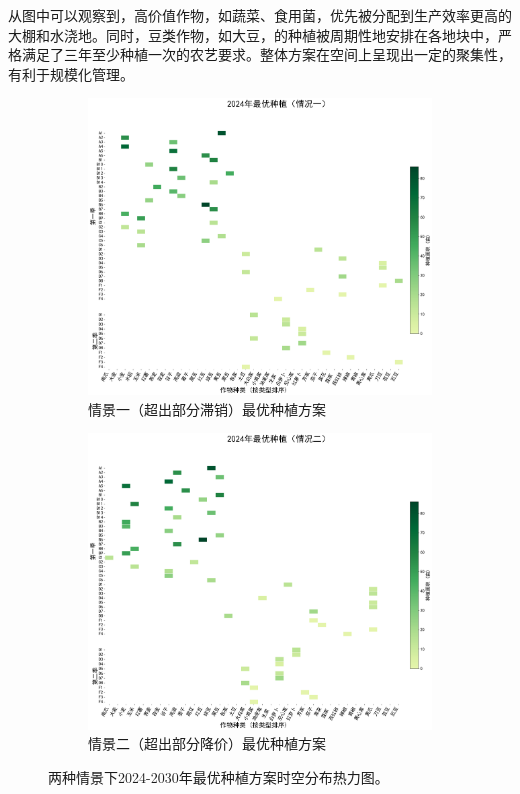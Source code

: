 从图中可以观察到，高价值作物，如蔬菜、食用菌，优先被分配到生产效率更高的大棚和水浇地。同时，豆类作物，如大豆，的种植被周期性地安排在各地块中，严格满足了三年至少种植一次的农艺要求。整体方案在空间上呈现出一定的聚集性，有利于规模化管理。

\begin{figure}[H]
	\centering
	\begin{subfigure}[b]{0.4\textwidth}
		\centering
		\includegraphics[width=\textwidth]{figs/3问题一/2024年最优种植方案（情况一）.png}
		\caption{情景一（超出部分滞销）最优种植方案}
		\label{fig:heatmap_case1}
	\end{subfigure}
	\begin{subfigure}[b]{0.4\textwidth}
		\centering
		\includegraphics[width=\textwidth]{figs/3问题一/2024年最优种植方案（情况二）.png}

		\caption{情景二（超出部分降价）最优种植方案}
		\label{fig:heatmap_case2}
	\end{subfigure}
	\caption{两种情景下2024-2030年最优种植方案时空分布热力图。}
	\label{fig:heatmap}
\end{figure}




